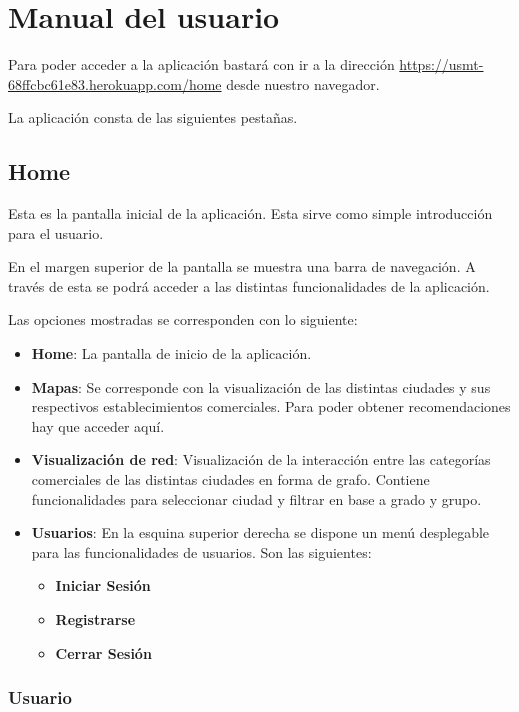 \section{Manual del usuario}

Para poder acceder a la aplicación bastará con ir a la dirección \url{https://usmt-68ffcbc61e83.herokuapp.com/home} desde nuestro navegador.

La aplicación consta de las siguientes pestañas.

\subsection{Home}

Esta es la pantalla inicial de la aplicación. Esta sirve como simple introducción para el usuario. 


En el margen superior de la pantalla se muestra una barra de navegación. A través de esta se podrá acceder a las distintas funcionalidades de la aplicación.


Las opciones mostradas se corresponden con lo siguiente:
\begin{itemize}
	\item \textbf{Home}: La pantalla de inicio de la aplicación.
	\item \textbf{Mapas}: Se corresponde con la visualización de las distintas ciudades y sus respectivos establecimientos comerciales. Para poder obtener recomendaciones hay que acceder aquí.
	\item \textbf{Visualización de red}: Visualización de la interacción entre las categorías comerciales de las distintas ciudades en forma de grafo. Contiene funcionalidades para seleccionar ciudad y filtrar en base a grado y grupo.
	\item \textbf{Usuarios}: En la esquina superior derecha se dispone un menú desplegable para las funcionalidades de usuarios. Son las siguientes:
	\begin{itemize}
		\item \textbf{Iniciar Sesión}
		\item \textbf{Registrarse}
		\item \textbf{Cerrar Sesión}
	\end{itemize}
\end{itemize}

\subsubsection{Usuario}

